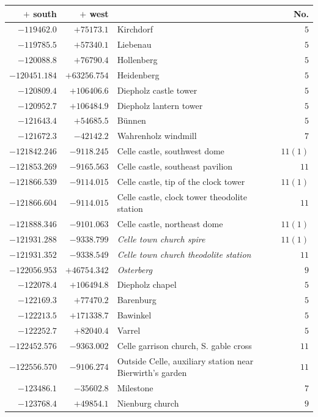 \begin{center}\begingroup\fontsize{8}{9}\selectfont
\setlength{\tabcolsep}{4pt}
\begin{tabular}{r|r|p{170pt}|r}\hline
\(+\) south&\(+\) west&&No.\\\hline
\(-119462.0\)&\(+75173.1\)&Kirchdorf&\(5\)\\
\(-119785.5\)&\(+57340.1\)&Liebenau&\(5\)\\
\(-120088.8\)&\(+76790.4\)&Hollenberg&\(5\)\\
\(-120451.184\)&\(+63256.754\)&Heidenberg&\(5\)\\
\(-120809.4\)&\(+106406.6\)&Diepholz castle tower&\(5\)\\
\(-120952.7\)&\(+106484.9\)&Diepholz lantern tower&\(5\)\\
\(-121643.4\)&\(+54685.5\)&Bünnen&\(5\)\\
\(-121672.3\)&\(-42142.2\)&Wahrenholz windmill&\(7\)\\
\(-121842.246\)&\(-9118.245\)&Celle castle, southwest dome&\(11 (1)\)\\
\(-121853.269\)&\(-9165.563\)&Celle castle, southeast pavilion&\(11\)\\
\(-121866.539\)&\(-9114.015\)&Celle castle, tip of the clock tower&\(11 (1)\)\\
\(-121866.604\)&\(-9114.015\)&Celle castle, clock tower theodolite station&\(11\)\\
\(-121888.346\)&\(-9101.063\)&Celle castle, northeast dome&\(11 (1)\)\\
\(-121931.288\)&\(-9338.799\)&\textit{Celle town church spire}&\(11 (1)\)\\
\(-121931.352\)&\(-9338.549\)&\textit{Celle town church theodolite station}&\(11\)\\
\(-122056.953\)&\(+46754.342\)&\textit{Osterberg}&\(9\)\\
\(-122078.4\)&\(+106494.8\)&Diepholz chapel&\(5\)\\
\(-122169.3\)&\(+77470.2\)&Barenburg&\(5\)\\
\(-122213.5\)&\(+171338.7\)&Bawinkel&\(5\)\\
\(-122252.7\)&\(+82040.4\)&Varrel&\(5\)\\
\(-122452.576\)&\(-9363.002\)&Celle garrison church, S. gable cross&\(11\)\\
\(-122556.570\)&\(-9106.274\)&Outside Celle, auxiliary station near Bierwirth’s garden&\(11\)\\
\(-123486.1\)&\(-35602.8\)&Milestone&\(7\)\\
\(-123768.4\)&\(+49854.1\)&Nienburg church&\(9\)\\

\end{tabular}
\end{center}
